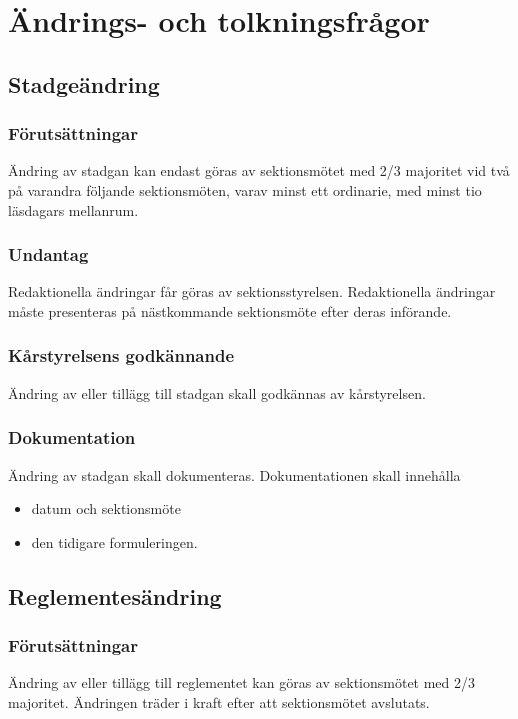 \section{Ändrings- och tolkningsfrågor}

\subsection{Stadgeändring}

\subsubsection{Förutsättningar}
Ändring av stadgan kan endast göras av sektionsmötet med 2/3 majoritet vid två på varandra följande sektionsmöten, varav minst ett ordinarie, med minst tio läsdagars mellanrum.

\subsubsection{Undantag}
Redaktionella ändringar får göras av sektionsstyrelsen. Redaktionella ändringar måste presenteras på nästkommande sektionsmöte efter deras införande.

\subsubsection{Kårstyrelsens godkännande}
Ändring av eller tillägg till stadgan skall godkännas av kårstyrelsen.

\subsubsection{Dokumentation}
Ändring av stadgan skall dokumenteras. Dokumentationen skall innehålla
\begin{itemize}
	\item datum och sektionsmöte
	\item den tidigare formuleringen.
\end{itemize}

\subsection{Reglementesändring}
\subsubsection{Förutsättningar}
Ändring av eller tillägg till reglementet kan göras av sektionsmötet med 2/3 majoritet. Ändringen träder i kraft efter att sektionsmötet avslutats.

